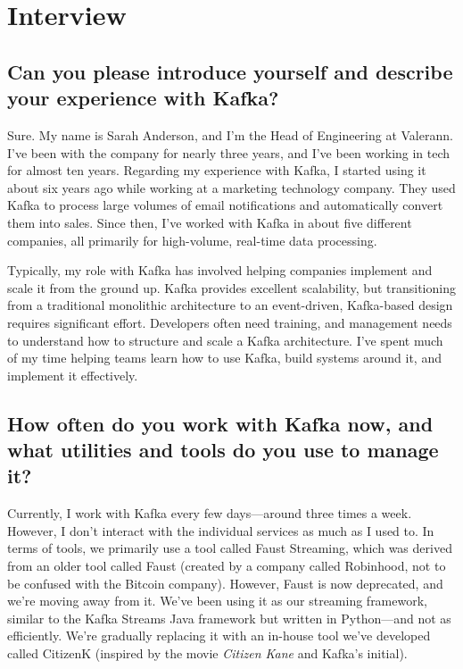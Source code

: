 \documentclass[10pt , a4paper]{report}
\begin{document}
\section{Interview}


\subsection*{Can you please introduce yourself and describe your experience with Kafka?}

Sure. My name is Sarah Anderson, and I’m the Head of Engineering at Valerann. I’ve been with the company for nearly three years, and I’ve been working in tech for almost ten years. Regarding my experience with Kafka, I started using it about six years ago while working at a marketing technology company. They used Kafka to process large volumes of email notifications and automatically convert them into sales. Since then, I’ve worked with Kafka in about five different companies, all primarily for high-volume, real-time data processing.

Typically, my role with Kafka has involved helping companies implement and scale it from the ground up. Kafka provides excellent scalability, but transitioning from a traditional monolithic architecture to an event-driven, Kafka-based design requires significant effort. Developers often need training, and management needs to understand how to structure and scale a Kafka architecture. I’ve spent much of my time helping teams learn how to use Kafka, build systems around it, and implement it effectively.

\subsection*{How often do you work with Kafka now, and what utilities and tools do you use to manage it?}

Currently, I work with Kafka every few days—around three times a week. However, I don’t interact with the individual services as much as I used to. In terms of tools, we primarily use a tool called Faust Streaming, which was derived from an older tool called Faust (created by a company called Robinhood, not to be confused with the Bitcoin company). However, Faust is now deprecated, and we’re moving away from it. We’ve been using it as our streaming framework, similar to the Kafka Streams Java framework but written in Python—and not as efficiently. We're gradually replacing it with an in-house tool we’ve developed called CitizenK (inspired by the movie \textit{Citizen Kane} and Kafka's initial).
\end{document}
